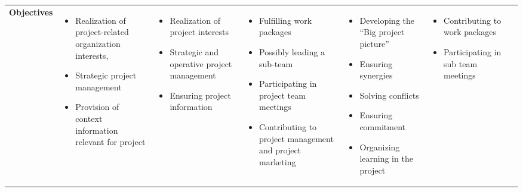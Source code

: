 \begin{table}
\begin{tabularx}{22cm}{X X X X X X r}
        \textbf{Objectives} & 
        \begin{itemize} [noitemsep,topsep=0pt, leftmargin=0pt]
            \item Realization of project-related organization interests, 
            \item Strategic project management
            \item Provision of context information relevant for project
        \end{itemize} & 
        \begin{itemize} [noitemsep,topsep=0pt, leftmargin=0pt]
            \item Realization of project interests
            \item Strategic and operative project management
            \item Ensuring project information 
        \end{itemize} & 
        \begin{itemize} [noitemsep,topsep=0pt, leftmargin=0pt]
            \item Fulfilling work packages
            \item Possibly leading a sub-team
            \item Participating in project team meetings
            \item Contributing to project management and project marketing 
        \end{itemize} & 
        \begin{itemize} [noitemsep,topsep=0pt, leftmargin=0pt]
            \item Developing the “Big project picture” 
            \item Ensuring synergies 
            \item Solving conflicts 
            \item Ensuring commitment 
            \item Organizing learning in the project 
        \end{itemize} & 
        \begin{itemize} [noitemsep,topsep=0pt, leftmargin=0pt]
            \item Contributing to work packages
            \item Participating in sub team meetings 
        \end{itemize} &
         \\
        

\end{tabularx}
\end{table}
